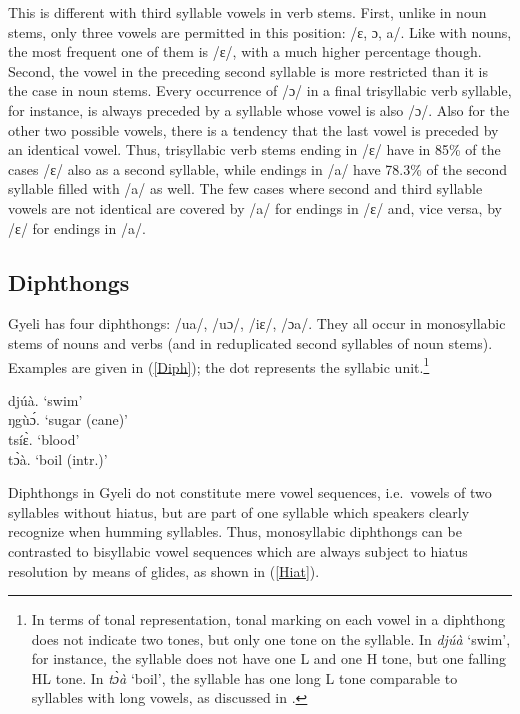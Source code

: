 This is different with third syllable vowels in verb stems. First, unlike in noun stems, only three vowels are permitted in this position: /ɛ, ɔ, a/. Like with nouns, the most frequent one of them is /ɛ/, with a much higher percentage though. Second, the vowel in the preceding second syllable is more restricted than it is the case in noun stems. Every occurrence of /ɔ/ in a final trisyllabic verb syllable, for instance, is always preceded by a syllable whose vowel is also /ɔ/. Also for the other two possible vowels, there is a tendency that the last vowel is preceded by an identical vowel. Thus, trisyllabic verb stems ending in /ɛ/ have in 85\% of the cases /ɛ/ also as a second syllable, while endings in /a/ have 78.3\% of the second syllable filled with /a/ as well. The few cases where second and third syllable vowels are not identical are covered by /a/ for endings in /ɛ/ and, vice versa, by /ɛ/ for endings in /a/.





\subsection{Diphthongs}
\label {sec:Diph}

Gyeli has four diphthongs: /ua/, /uɔ/, /iɛ/, /ɔa/. They all occur in monosyllabic stems of nouns and verbs (and in reduplicated second syllables of noun stems). Examples are given in (\ref{Diph}); the dot represents the syllabic unit.\footnote{In terms of tonal representation, tonal marking on each vowel in a diphthong does not indicate two tones, but only one tone on the syllable. In {\itshape djúà} `swim', for instance, the syllable does not have one L and one H tone, but one falling HL tone. In {\itshape tɔ̀à} `boil', the syllable has one long L tone comparable to syllables with long vowels, as discussed in .}

\begin{exe} \ex \label{Diph}
djúà. `swim'  \\
ŋgùɔ́. `sugar (cane)' \\
tsíɛ̀. `blood' \\
tɔ̀à. `boil (intr.)'
\end{exe}

Diphthongs in Gyeli do not constitute mere vowel sequences, i.e.\ vowels of two syllables without hiatus, but are part of one syllable which speakers clearly recognize when humming syllables. Thus, monosyllabic diphthongs can be contrasted to bisyllabic vowel sequences which are always subject to hiatus resolution by means of glides, as shown in (\ref{Hiat}).

